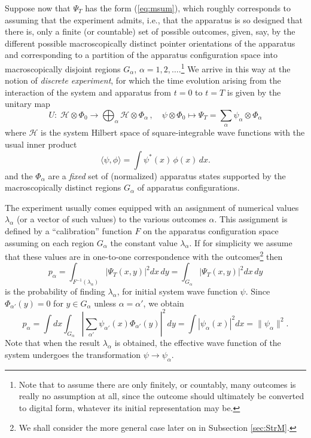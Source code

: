 \documentclass[12pt]{article}
\newcommand{\wf}{wave function}
\renewcommand{\a}{\alpha}
\newcommand{\la}{\lambda_{\a}}
\newcommand{\suma}{\sum_{\a }}
\newcommand{\ot}{\otimes}
\newcommand{\psia}{\psi_{\a}}
\newcommand{\Phia}{\Phi_{\a}}
\renewcommand{\H}{\mbox{$\mathcal{H}$}}
\begin{document}
Suppose now that $\Psi_{T}$ has the form (\ref{eq:msum}), which
roughly corresponds to assuming that the experiment admits, i.e., that
the apparatus is so designed that there is, only a finite (or
countable) set of possible outcomes, given, say, by the different
possible macroscopically distinct pointer orientations of the
apparatus and corresponding to a partition of the apparatus
configuration space into macroscopically disjoint regions $G_{\a}$,
$\a=1,2, \ldots$.\footnote{Note that to assume there are only
   finitely, or countably, many outcomes is really no assumption at
   all, since the outcome should ultimately be converted to digital
   form, whatever its initial representation may be.} We arrive in this
way at the notion of \emph{discrete experiment}, for which the time
evolution arising {}from the interaction of the system and apparatus
{}from $t=0$ to $t=T$ is given by the unitary map
\begin{equation}
U : \;{\H}\ot\Phi_0 \to \bigoplus_{\a} {\H} \ot\Phia \, , \quad
\psi \ot \Phi_0 \mapsto \Psi_{T} =\suma \psia \ot \Phia
\label{eq:ormfin}
\end{equation}
%
where $\mathcal{H}$ is the system Hilbert space of square-integrable
wave functions with the usual inner product
$$
\langle\psi,\phi\rangle=\int{{\psi}^*( x)\,\phi( x)\,dx}.
$$
and the $\Phia$ are a \emph{fixed} set of (normalized) apparatus
states supported by the macroscopically distinct regions $G_{\a}$ of
apparatus configurations.

The experiment usually comes equipped with an assignment of numerical
values $\la$ (or a vector of such values) to the various outcomes
$\a$.  This assignment is defined by a ``calibration'' function $F$ on
the apparatus configuration space assuming on each region $G_{\a}$ the
constant value $\la$.  If for simplicity we assume that these values
are in one-to-one correspondence with the outcomes\footnote{We shall
   consider the more general case later on in Subsection
   \ref{sec:StrM}.} then
\begin{equation}
p_{\a} = \int_{F^{-1}(\la)} |\Psi_{T}(x,y)|^{2}
dx\,dy=\int_{G_{\a}} |\Psi_{T}(x,y)|^{2} dx\,dy
\label{eq:page}
\end{equation}
is the probability of finding $\la$, for initial system \wf{} $\psi$.
Since $\Phi_{\a'}(y)=0$ for $y\in G_{\a}$ unless $\a=\a'$, we obtain
\begin{equation}
p_{\a}=\int dx\int_{G_{\a}} |\sum_{\a'} \psi_{\a'} (x)
\Phi_{\a'} (y)|^{2}\,dy = \int | \psia (x) |^2 dx = \|\psia \|^2 .
\label{eq:pr}
\end{equation}
Note that when the result $\la$ is obtained, the effective wave
function of the system undergoes the transformation $\psi \to
\psi_\a.$
\end{document}
